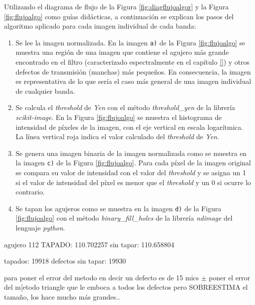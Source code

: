 Utilizando el diagrama de flujo de la Figura \ref{fig:diagflujoalgor} y la Figura \ref{fig:flujoalgo} como guías didácticas, a continuación se explican los pasos del algoritmo aplicado para cada imagen individual de cada banda:
\begin{enumerate}
\justifying
\item Se lee la imagen normalizada. En la imagen \texttt{a)} de la Figura \ref{fig:flujoalgo} se muestra una región de una imagen que contiene el agujero más grande encontrado en el filtro (caracterizado espectralmente en el capítulo \ref{}) y otros defectos de transmisión (manchas) más pequeños. En consecuencia, la imagen es representativa de lo que sería el caso más general de una imagen individual de cualquier banda.
\item Se calcula el \textit{threshold} de \textit{Yen} con el método \textit{threshold\_yen} de la librería \textit{scikit-image}. En la Figura \ref{fig:flujoalgo} se muestra el histograma de intensidad de píxeles de la imagen, con el eje vertical en escala logarítmica. La línea vertical roja indica el valor calculado del \textit{threshold} de \textit{Yen}.
\item Se genera una imagen binaria de la imagen normalizada como se muestra en la imagen \texttt{c)} de la Figura \ref{fig:flujoalgo}. Para cada píxel de la imagen original se compara su valor de intensidad con el valor del \textit{threshold} y se asigna un 1 si el valor de intensidad del píxel es menor que el \textit{threshold} y un 0 si ocurre lo contrario.
\item Se tapan los agujeros como se muestra en la imagen \texttt{d)} de la Figura \ref{fig:flujoalgo} con el método \textit{binary\_fill\_holes} de la librería \textit{ndimage} del lenguaje \textit{python}. 
\end{enumerate}

agujero 112 TAPADO: 110.702257
sin tapar: 110.658804

tapados: 19918 defectos
sin tapar: 19930

para poner el error del metodo en decir un defecto es de 15 mics $\pm$ poner el error del m[etodo triangle que le emboca a todos los defectos pero SOBREESTIMA el tamaño, los hace mucho más grandes..

\vspace{1cm}
\vspace{1cm}


